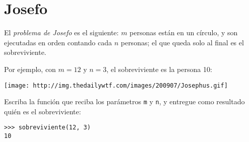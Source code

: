 \section{Josefo}

El \emph{problema de Josefo} es el siguiente:
\(m\) personas están en un círculo, y son
ejecutadas en orden contando cada \(n\) personas; el que queda solo al
final es el sobreviviente.

Por ejemplo, con \(m = 12\) y \(n = 3\),
el sobreviviente es la persona 10:

\texttt{[image: http://img.thedailywtf.com/images/200907/Josephus.gif]}

Escriba la función que reciba los parámetros \lstinline!m! y
\lstinline!n!, y entregue como resultado quién es el sobreviviente:

\begin{lstlisting}
>>> sobreviviente(12, 3)
10
\end{lstlisting}


